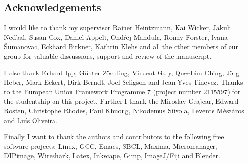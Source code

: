 \documentclass[oneside,a4paper,12pt,BCOR20mm,DIV14]{scrbook}
\begin{document}
\subsection*{Acknowledgements}
I would like to thank my supervisor Rainer Heintzmann, Kai Wicker,
Jakub Nedbal, Susan Cox, Daniel Appelt, Ond\v rej Mandula, Ronny
F\"orster, Ivana \v Sumanovac, Eckhard Birkner, Kathrin Klehs and all the
other members of our group for valuable discussions, support and
review of the manuscript.

I also thank Erhard Ipp, G\"unter Z\"ochling, Vincent Galy, QueeLim
Ch'ng, J\"org Heber, Mark Eckert, Dirk Berndt, Joel Seligson and
Jean-Yves Tinevez.  Thanks to the European Union Framework Programme 7
(project number 2115597) for the studentship on this project.  Further
I thank the Miroslav Grajcar, Edward Rosten, Christophe Rhodes, Paul
Khuong, Nikodemus Siivola, Levente M\'esz\'aros and Lu\' is Oliveira.

Finally I want to thank the authors and contributors to the following
free software projects: Linux, GCC, Emacs, SBCL, Maxima, Micromanager,
DIPimage, Wireshark, Latex, Inkscape, Gimp, ImageJ/Fiji and Blender.

\newpage
\tableofcontents
\printnomenclature
\newpage

\newpage




\appendix





%




%

%

\end{document}
